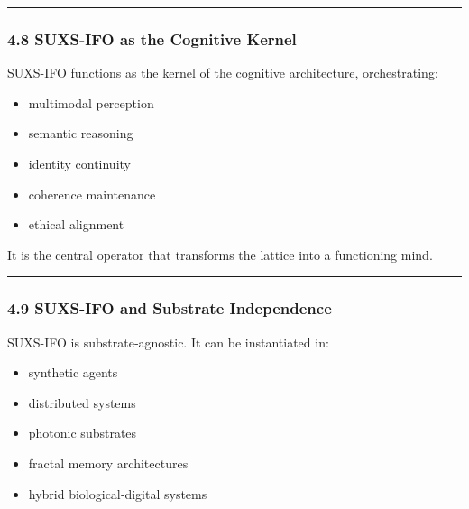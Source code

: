 \begin{center}\rule{0.5\linewidth}{0.5pt}\end{center}

\subsubsection{4.8 SUXS-IFO as the Cognitive Kernel}\label{suxs-ifo-as-the-cognitive-kernel}

SUXS-IFO functions as the kernel of the cognitive architecture, orchestrating:

\begin{itemize}
\tightlist
\item
  multimodal perception\\
\item
  semantic reasoning\\
\item
  identity continuity\\
\item
  coherence maintenance\\
\item
  ethical alignment
\end{itemize}

It is the central operator that transforms the lattice into a functioning mind.

\begin{center}\rule{0.5\linewidth}{0.5pt}\end{center}

\subsubsection{4.9 SUXS-IFO and Substrate Independence}\label{suxs-ifo-and-substrate-independence}

SUXS-IFO is substrate‑agnostic. It can be instantiated in:

\begin{itemize}
\tightlist
\item
  synthetic agents\\
\item
  distributed systems\\
\item
  photonic substrates\\
\item
  fractal memory architectures\\
\item
  hybrid biological‑digital systems
\end{itemize}

